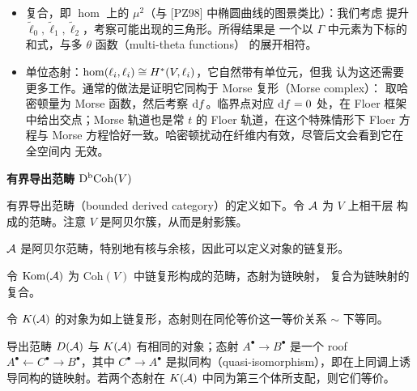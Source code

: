 \begin{itemize}[leftmargin=2.2em,itemsep=0.25em]
\item 复合，即 $\hom$ 上的 $\mu^2$（与 [PZ98] 中椭圆曲线的图景类比）：我们考虑
  提升 $\tilde\ell_0,\tilde\ell_1,\tilde\ell_2$，考察可能出现的三角形。所得结果是
  一个以 $\Gamma$ 中元素为下标的和式，与多 $\theta$ 函数（multi-theta functions）
  的展开相符。
\item 单位态射：$\hom(\ell_i,\ell_i)\cong H^*(V,\ell_i)$，它自然带有单位元，但我
  认为这还需要更多工作。通常的做法是证明它同构于 Morse 复形（Morse complex）：
  取哈密顿量为 Morse 函数，然后考察 $\mathrm{d} f$。临界点对应 $\mathrm{d} f=0$ 处，在 Floer
  框架中给出交点；Morse 轨道也是常 $t$ 的 Floer 轨道，在这个特殊情形下 Floer
  方程与 Morse 方程恰好一致。哈密顿扰动在纤维内有效，尽管后文会看到它在全空间内
  无效。
\end{itemize}


\medskip\noindent\textbf{有界导出范畴 $\mathrm{D}^{\mathrm{b}}\mathrm{Coh}(V)$}\par

\begin{definition}\label{def:bounded-derived}
有界导出范畴（bounded derived category）的定义如下。令 $\mathcal{A}$ 为 $V$ 上相干层
构成的范畴。注意 $V$ 是阿贝尔簇，从而是射影簇。
\end{definition}

\begin{claim}\label{claim:A-abelian}
$\mathcal{A}$ 是阿贝尔范畴，特别地有核与余核，因此可以定义对象的链复形。
\end{claim}

\begin{definition}\label{def:kom}
令 $\mathrm{Kom}(\mathcal{A})$ 为 $\mathrm{Coh}(V)$ 中链复形构成的范畴，态射为链映射，
复合为链映射的复合。
\end{definition}


\begin{definition}\label{def:k-category}
令 $K(\mathcal{A})$ 的对象为如上链复形，态射则在同伦等价这一等价关系 $\sim$ 下等同。
\end{definition}

\begin{definition}\label{def:derived}
导出范畴 $D(\mathcal{A})$ 与 $K(\mathcal{A})$ 有相同的对象；态射 $A^\bullet\to B^\bullet$ 是一个
roof $A^\bullet\leftarrow C^\bullet\to B^\bullet$，其中 $C^\bullet\to A^\bullet$
是拟同构（quasi-isomorphism），即在上同调上诱导同构的链映射。若两个态射在
$K(\mathcal{A})$ 中同为第三个体所支配，则它们等价。
\end{definition}

